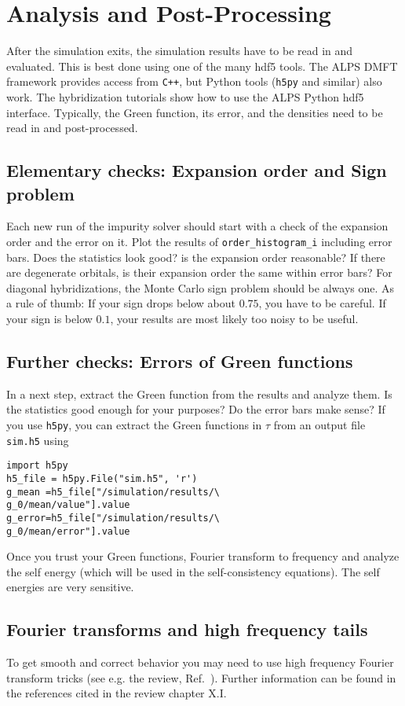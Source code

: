 \documentclass[aps,prb,floatfix,superscriptaddress,twocolumn,notitlepage]{revtex4-1}
\begin{document}
\section{Analysis and Post-Processing}
After the simulation exits, the simulation results have to be read in and evaluated. This is best done using one of the many hdf5 tools. The ALPS DMFT framework provides access from \verb#C++#, but Python
tools (\verb#h5py# and similar) also work. The hybridization tutorials show how to use the ALPS Python hdf5 interface. Typically, the Green function, its error, and the densities need to be read in and post-processed.


\subsection{Elementary checks: Expansion order and Sign problem}
Each new run of the impurity solver should start with a check of the expansion order and the error on it. Plot the results of \verb#order_histogram_i# including error bars. Does the statistics  look good? is the expansion order reasonable? If there are degenerate orbitals, is their expansion order the same within error bars?
For diagonal hybridizations, the Monte Carlo sign problem should be always one. As a rule of thumb: If your sign drops below about $0.75$, you have to be careful. If your sign is below $0.1$, your results are most likely too noisy to be useful.

\subsection{Further checks: Errors of Green functions}
In a next step, extract the Green function from the results and analyze them. Is the statistics good enough for your purposes? Do the error bars make sense? 
If you use \verb#h5py#, you can extract the Green functions in $\tau$ from an output file \verb#sim.h5# using
\begin{verbatim}
import h5py
h5_file = h5py.File("sim.h5", 'r')
g_mean =h5_file["/simulation/results/\
g_0/mean/value"].value
g_error=h5_file["/simulation/results/\
g_0/mean/error"].value
\end{verbatim}
Once you trust your Green functions, Fourier transform to frequency and analyze the self energy (which will be used in the self-consistency equations). The self energies are very sensitive.

\subsection{Fourier transforms and high frequency tails}
To get smooth and correct behavior you may need to use high frequency Fourier transform tricks (see e.g. the review, Ref.~). Further information can be found in the references cited in the review chapter X.I.
\end{document}
